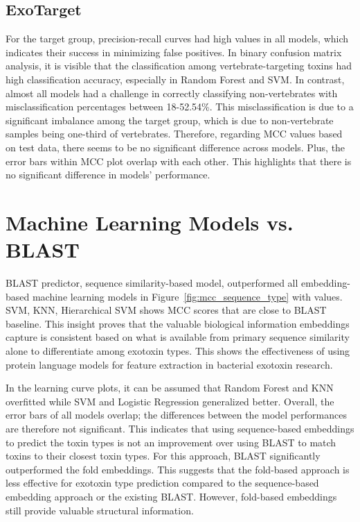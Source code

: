 \subsection{ExoTarget}
For the target group, precision-recall curves had high values in all models, which indicates their success in minimizing false positives.
In binary confusion matrix analysis, it is visible that the classification among vertebrate-targeting toxins had high classification accuracy, especially in Random Forest and \gls{SVM}. In contrast, almost all models had a challenge in correctly classifying non-vertebrates with misclassification percentages between 18-52.54\%. This misclassification is due to a significant imbalance among the target group, which is due to non-vertebrate samples being one-third of vertebrates.
Therefore, regarding \gls{MCC} values based on test data, there seems to be no significant difference across models. Plus, the error bars within \gls{MCC} plot overlap with each other. This highlights that there is no significant difference in models' performance.


\section{Machine Learning Models vs. BLAST}

\Gls{BLAST} predictor, sequence similarity-based model, outperformed all embedding-based machine learning models in Figure~\ref{fig:mcc_sequence_type} with values. \gls{SVM}, \gls{KNN}, Hierarchical \gls{SVM} shows \gls{MCC} scores that are close to \gls{BLAST} baseline. This insight proves that the valuable biological information embeddings capture is consistent based on what is available from primary sequence similarity alone to differentiate among exotoxin types.
This shows the effectiveness of using protein language models for feature extraction in bacterial exotoxin research.

In the learning curve plots, it can be assumed that Random Forest and \gls{KNN} overfitted while \gls{SVM} and Logistic Regression generalized better. Overall, the error bars of all models overlap; the differences between the model performances are therefore not significant.  This indicates that using sequence-based embeddings to predict the toxin types is not an improvement over using \gls{BLAST} to match toxins to their closest toxin types. For this approach, \gls{BLAST} significantly outperformed the fold embeddings. 
This suggests that the fold-based approach is less effective for exotoxin type prediction compared to the sequence-based embedding approach or the existing \gls{BLAST}. However, fold-based embeddings still provide valuable structural information.

